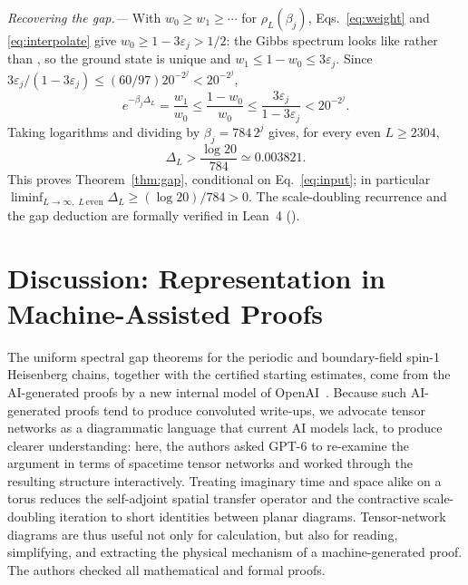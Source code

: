 \documentclass[aps,prl,reprint,amsmath,amssymb,nofootinbib,raggedbottom]{revtex4-2}
\begin{document}
\emph{Recovering the gap.---}
With $w_0\ge w_1\ge\cdots$ for $\rho_L(\beta_j)$, Eqs.~\eqref{eq:weight} and
\eqref{eq:interpolate} give $w_0\ge1-3\varepsilon_j>1/2$: the Gibbs spectrum
looks like  rather than , so the
ground state is unique and $w_1\le 1-w_0\le 3\varepsilon_j$. Since
$3\varepsilon_j/(1-3\varepsilon_j)\le(60/97)20^{-2^j}<20^{-2^j}$,
\begin{equation}
 e^{-\beta_j\Delta_L}=\frac{w_1}{w_0}
 \le\frac{1-w_0}{w_0}
 \le\frac{3\varepsilon_j}{1-3\varepsilon_j}
 <20^{-2^j}.
 \label{eq:gapratio}
\end{equation}
Taking logarithms and dividing by $\beta_j=784\,2^j$ gives, for every
even $L\ge2304$,
\begin{equation}
 \boxed{\Delta_L>\frac{\log20}{784}\simeq0.003821.}
 \label{eq:gap}
\end{equation}
This proves Theorem~\ref{thm:gap}, conditional on Eq.~\eqref{eq:input};
in particular $\liminf_{L\to\infty,\;L\,\mathrm{even}}\Delta_L\ge(\log20)/784>0$.
The scale-doubling recurrence and the gap deduction are formally verified in Lean~4 ().


\section*{Discussion: Representation in Machine-Assisted Proofs}
The uniform spectral gap theorems for the periodic and boundary-field spin-1 Heisenberg chains, together with the certified starting estimates, come from the AI-generated proofs by a new internal model of OpenAI~\cite{source,boundary}. Because such AI-generated proofs tend to produce convoluted write-ups, we advocate tensor networks as a diagrammatic language that current AI models lack, to produce clearer understanding: here, the authors asked GPT-6 to re-examine the argument in terms of spacetime tensor networks and worked through the resulting structure interactively. Treating imaginary time and space alike on a torus reduces the self-adjoint spatial transfer operator and the contractive scale-doubling iteration to short identities between planar diagrams. Tensor-network diagrams are thus useful not only for calculation, but also for reading, simplifying, and extracting the physical mechanism of a machine-generated proof. The authors checked all mathematical and formal proofs.
\end{document}
